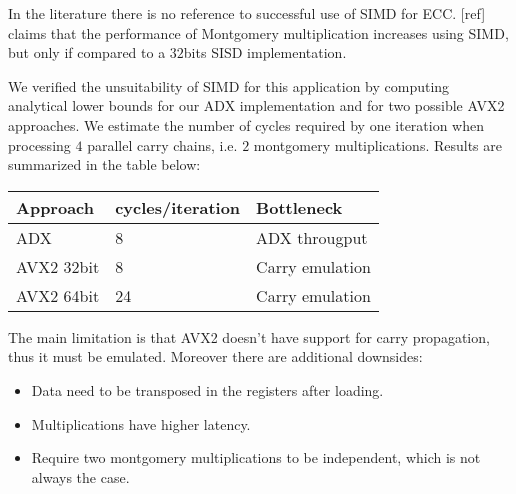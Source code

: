 In the literature there is no reference to successful use of SIMD for ECC. [ref] claims that the performance of Montgomery multiplication increases using SIMD, but only if compared to a $32$bits SISD implementation.

We verified the unsuitability of SIMD for this application by computing analytical lower bounds for our ADX implementation and for two possible AVX2 approaches.
We estimate the number of cycles required by one iteration when processing $4$ parallel carry chains, i.e. $2$ montgomery multiplications. Results are summarized in the table below:

\begin{tabular}{ |l|l|l|}
	\hline
 	Approach & cycles/iteration & Bottleneck \\ \hline
 	ADX & 8 & ADX througput \\ \hline
  	AVX2 32bit & 8 & Carry emulation \\ \hline
 	AVX2 64bit & 24 & Carry emulation \\ \hline
\end{tabular}

The main limitation is that AVX2 doesn't have support for carry propagation, thus it must be emulated. Moreover there are additional downsides:
\begin{itemize}
\item Data need to be transposed in the registers after loading.
\item Multiplications have higher latency.
\item Require two montgomery multiplications to be independent, which is not always the case.
\end{itemize}
